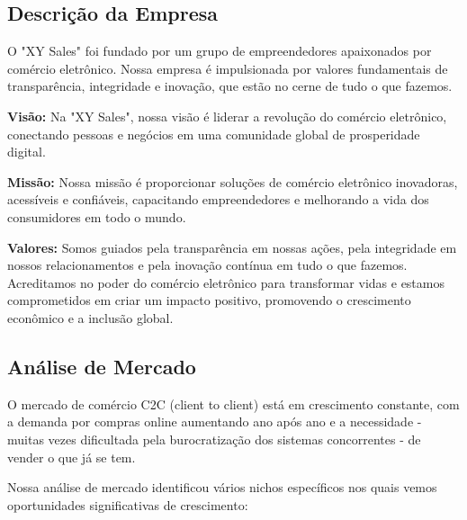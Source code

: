 \documentclass[
	12pt,				%
	openright,			%
	twoside,			%
	a4paper,			%
	english,			%
	brazil				%
	]{abntex2}
\begin{document}
\subsection{Descrição da Empresa}

O "XY Sales" foi fundado por um grupo de empreendedores apaixonados por comércio eletrônico. Nossa empresa é impulsionada por valores fundamentais de transparência, integridade e inovação, que estão no cerne de tudo o que fazemos.

\textbf{Visão:} Na "XY Sales", nossa visão é liderar a revolução do comércio eletrônico, conectando pessoas e negócios em uma comunidade global de prosperidade digital.

\textbf{Missão:} Nossa missão é proporcionar soluções de comércio eletrônico inovadoras, acessíveis e confiáveis, capacitando empreendedores e melhorando a vida dos consumidores em todo o mundo.

\textbf{Valores:} Somos guiados pela transparência em nossas ações, pela integridade em nossos relacionamentos e pela inovação contínua em tudo o que fazemos. Acreditamos no poder do comércio eletrônico para transformar vidas e estamos comprometidos em criar um impacto positivo, promovendo o crescimento econômico e a inclusão global.


\subsection{Análise de Mercado}

O mercado de comércio C2C (client to client) está em crescimento constante, com a demanda por compras online aumentando ano após ano e a necessidade - muitas vezes dificultada pela burocratização dos sistemas concorrentes - de vender o que já se tem.

Nossa análise de mercado identificou vários nichos específicos nos quais vemos oportunidades significativas de crescimento: 
\end{document}
